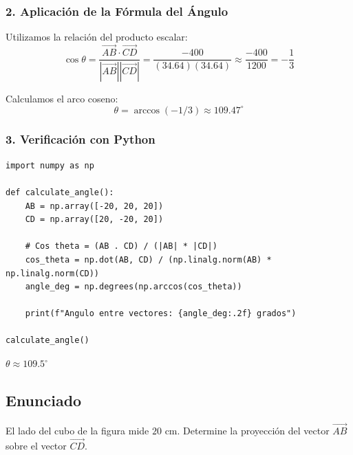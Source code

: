 \documentclass[12pt, a4paper]{article}
\begin{document}
\subsubsection*{2. Aplicación de la Fórmula del Ángulo}
Utilizamos la relación del producto escalar:
\begin{equation*}
    \cos \theta = \frac{\vec{AB} \cdot \vec{CD}}{|\vec{AB}| |\vec{CD}|} = \frac{-400}{(34.64)(34.64)} \approx \frac{-400}{1200} = -\frac{1}{3}
\end{equation*}

Calculamos el arco coseno:
\begin{equation*}
    \theta = \arccos(-1/3) \approx 109.47^\circ
\end{equation*}

\subsubsection*{3. Verificación con Python}
\begin{lstlisting}
import numpy as np

def calculate_angle():
    AB = np.array([-20, 20, 20])
    CD = np.array([20, -20, 20])
    
    # Cos theta = (AB . CD) / (|AB| * |CD|)
    cos_theta = np.dot(AB, CD) / (np.linalg.norm(AB) * np.linalg.norm(CD))
    angle_deg = np.degrees(np.arccos(cos_theta))
    
    print(f"Angulo entre vectores: {angle_deg:.2f} grados")

calculate_angle()
\end{lstlisting}

\begin{tcolorbox}[colback=green!5!white, colframe=green!50!black, title=Respuesta Final]
\centering \Large $\theta \approx 109.5^\circ$
\end{tcolorbox}

\newpage

\subsection*{Enunciado}
El lado del cubo de la figura mide $20$ cm. Determine la proyección del vector $\vec{AB}$ sobre el vector $\vec{CD}$.
\end{document}

